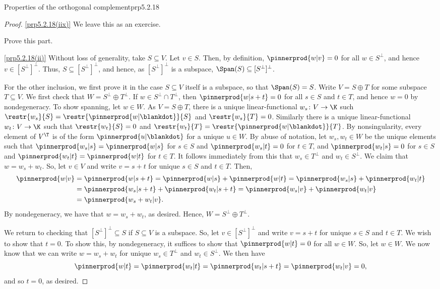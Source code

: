 \begin{prp}{Properties of the orthogonal complement}{prp5.2.18}
\begin{proof}
		\blni
		\cref{prp5.2.18(iix)} We leave this as an exercise.
		\begin{exr}[breakable=false]{}{}
			Prove this part.
		\end{exr}
		
		\blni
		\cref{prp5.2.18(ii)} Without loss of generality, take $S\subseteq V$.  Let $v\in S$.  Then, by definition, $\pinnerprod{w|v}=0$ for all $w\in S^{\perp}$, and hence $v\in [S^{\perp}]^{\perp}$.  Thus, $S\subseteq [S^{\perp}]^{\perp}$, and hence, as $[S^{\perp}]^{\perp}$ is a subspace, $\Span (S)\subseteq [S^{\perp}]^{\perp}$.
		
		For the other inclusion, we first prove it in the case $S\subseteq V$ itself is a subspace, so that $\Span (S)=S$.  Write $V=S\oplus T$ for some subspace $T\subseteq V$.  We first check that $W=S^{\perp}\oplus T^{\perp}$.  If $w\in S^{\perp}\cap T^{\perp}$, then $\pinnerprod{w|s+t}=0$ for all $s\in S$ and $t\in T$, and hence $w=0$ by nondegeneracy.  To show spanning, let $w\in W$.  As $V=S\oplus T$, there is a unique linear-functional $w_s\colon V\rightarrow \K$ such $\restr{w_s}{S}=\restr{\pinnerprod{w|\blankdot}}{S}$ and $\restr{w_s}{T}=0$.  Similarly there is a unique linear-functional $w_t\colon V\rightarrow \K$ such that $\restr{w_t}{S}=0$ and $\restr{w_t}{T}=\restr{\pinnerprod{w|\blankdot}}{T}$.  By nonsingularity, every element of $V^{\T}$ is of the form $\pinnerprod{u|\blankdot}$ for a unique $u\in W$.  By abuse of notation, let $w_s,w_t\in W$ be the unique elements such that $\pinnerprod{w_s|s}=\pinnerprod{w|s}$ for $s\in S$ and $\pinnerprod{w_s|t}=0$ for $t\in T$, and $\pinnerprod{w_t|s}=0$ for $s\in S$ and $\pinnerprod{w_t|t}=\pinnerprod{w|t}$ for $t\in T$.  It follows immediately from this that $w_s\in T^{\perp}$ and $w_t\in S^{\perp}$.  We claim that $w=w_s+w_t$.  So, let $v\in V$ and write $v=s+t$ for unique $s\in S$ and $t\in T$.  Then,
		\begin{equation}
			\begin{split}
				\pinnerprod{w|v} & =\pinnerprod{w|s+t}=\pinnerprod{w|s}+\pinnerprod{w|t}=\pinnerprod{w_s|s}+\pinnerprod{w_t|t} \\
				& =\pinnerprod{w_s|s+t}+\pinnerprod{w_t|s+t}=\pinnerprod{w_s|v}+\pinnerprod{w_t|v} \\
				& =\pinnerprod{w_s+w_t|v}.
			\end{split}
		\end{equation}
		By nondegeneracy, we have that $w=w_s+w_t$, as desired.  Hence, $W=S^{\perp}\oplus T^{\perp}$.
		
		We return to checking that $[S^{\perp}]^{\perp}\subseteq S$ if $S\subseteq V$ is a subspace.  So, let $v\in [S^{\perp}]^{\perp}$ and write $v=s+t$ for unique $s\in S$ and $t\in T$.  We wish to show that $t=0$.  To show this, by nondegeneracy, it suffices to show that $\pinnerprod{w|t}=0$ for all $w\in W$.  So, let $w\in W$.  We now know that we can write $w=w_s+w_t$ for unique $w_s\in T^{\perp}$ and $w_t\in S^{\perp}$.  We then have
		\begin{equation}
		\pinnerprod{w|t}=\pinnerprod{w_t|t}=\pinnerprod{w_t|s+t}=\pinnerprod{w_t|v}=0,
		\end{equation}
		and so $t=0$, as desired.
		

\end{proof}
\end{prp}
